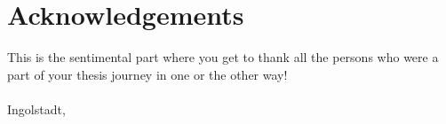 \chapter*{Acknowledgements}

This is the sentimental part where you get to thank all the persons who were a part of
your thesis journey in one or the other way!\\[2em]
\noindent \myauthor\\
Ingolstadt, \mysubmitted
